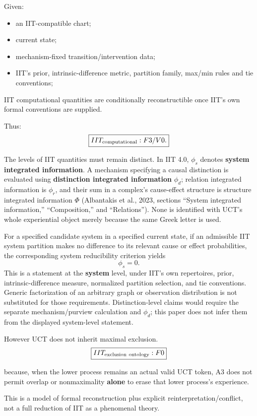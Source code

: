 \documentclass[
  11pt,
  a4paper,
]{article}
\providecommand{\tightlist}{%
  \setlength{\itemsep}{0pt}\setlength{\parskip}{0pt}}
\begin{document}
Given:

\begin{itemize}
\tightlist
\item
  an IIT-compatible chart;
\item
  current state;
\item
  mechanism-fixed transition/intervention data;
\item
  IIT's prior, intrinsic-difference metric, partition family, max/min
  rules and tie conventions;
\end{itemize}

IIT computational quantities are conditionally reconstructible once
IIT's own formal conventions are supplied.

Thus:
\nopagebreak[4]
\[
\boxed{
IIT_{\rm computational}:F3/V0.
}
\]

The levels of IIT quantities must remain distinct. In IIT 4.0,
\(\phi_s\) denotes \textbf{system integrated information}. A mechanism
specifying a causal distinction is evaluated using \textbf{distinction
integrated information} \(\phi_d\); relation integrated information is
\(\phi_r\), and their sum in a complex's cause-effect structure is
structure integrated information \(\Phi\) (Albantakis et al., 2023,
sections ``System integrated information,'' ``Composition,'' and
``Relations''). None is identified with UCT's whole experiential object
merely because the same Greek letter is used.

For a specified candidate system in a specified current state, if an
admissible IIT system partition makes no difference to its relevant
cause or effect probabilities, the corresponding system reducibility
criterion yields \[
\phi_s=0.
\] This is a statement at the \textbf{system} level, under IIT's own
repertoires, prior, intrinsic-difference measure, normalized partition
selection, and tie conventions. Generic factorization of an arbitrary
graph or observation distribution is not substituted for those
requirements. Distinction-level claims would require the separate
mechanism/purview calculation and \(\phi_d\); this paper does not infer
them from the displayed system-level statement.

However UCT does not inherit maximal exclusion.
\nopagebreak[4]
\[
\boxed{
IIT_{\rm exclusion\ ontology}:F0
}
\]

because, when the lower process remains an actual valid UCT token, A3
does not permit overlap or nonmaximality \textbf{alone} to erase that
lower process's experience.

This is a model of formal reconstruction plus explicit
reinterpretation/conflict, not a full reduction of IIT as a phenomenal
theory.
\end{document}
